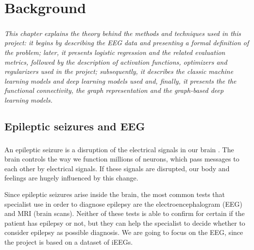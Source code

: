 
\chapter{Background} \label{chap: background}

\paragraph{} \textit{This chapter explains the theory behind the methods and techniques used in this project: it begins by describing the EEG data and presenting a formal definition of the problem; later, it presents logistic regression and the related evaluation metrics, followed by the description of activation functions, optimizers and regularizers used in the project; subsequently, it describes the classic machine learning models and deep learning models used and, finally, it presents the the functional connectivity, the graph representation and the graph-based deep learning models.}


\section{Epileptic seizures and EEG} \label{sec: epileptic_seizures_and_eeg}
\paragraph{} An epileptic seizure is a disruption of the electrical signals in our brain \cite{EpilepsySociety:aboutepilepsy}. The brain controls the way we function millions of neurons, which pass messages to each other by electrical signals. If these signals are disrupted, our body and feelings are hugely influenced by this change.

Since epileptic seizures arise inside the brain, the most common tests that specialist use in order to diagnose epilepsy are the electroencephalogram (EEG) and MRI (brain scans). Neither of these tests is able to confirm for certain if the patient has epilepsy or not, but they can help the specialist to decide whether to consider epilepsy as possible diagnosis. We are going to focus on the EEG, since the project is based on a dataset of iEEGs.

